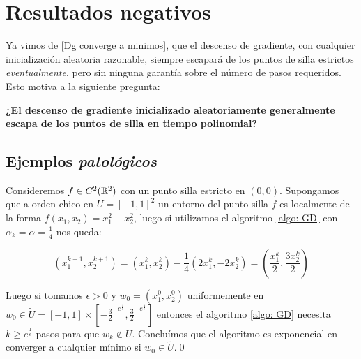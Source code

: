 \chapter{Resultados negativos}\label{ch:resultadosNegativos}

Ya vimos de \ref{Dg converge a minimos}, que el descenso de gradiente, con cualquier inicialización aleatoria razonable, siempre escapará de los puntos de silla estrictos \textit{eventualmente}, pero sin ninguna garantía sobre el número de pasos requeridos. Esto motiva a la siguiente
pregunta:

\textbf{¿El descenso de gradiente inicializado aleatoriamente generalmente escapa de los puntos de silla en tiempo polinomial?}

\section{Ejemplos \textit{patol\'ogicos}}

\begin{example}
	Consideremos $f \in C^2({\mathbb{R}}^2)$ con un punto silla estricto en $(0,0)$. Supongamos que a orden chico en $U = [-1,1]^2$ un entorno del punto silla $f$ es localmente de la forma $f(x_1, x_2) = x_1^2 - x_2^2$, luego si utilizamos el algoritmo \ref{algo: GD} con $\alpha_k = \alpha = \frac{1}{4}$ nos queda:
	
	\begin{equation*}
		\left(x_1^{k+1}, x^{k+1}_2\right) = \left(x^k_1, x^k_2\right)- \frac{1}{4} \left(2x^k_1, -2x^k_2\right) = \left(\frac{x^k_1}{2}, \frac{3 x^k_2}{2}\right)
	\end{equation*}
	
	Luego si tomamos $\epsilon >0$ y $w_0 = (x_1^0, x_2^0)$ uniformemente en $w_0\in \widetilde{U} = [-1,1] \times \left[- \frac{3}{2}^{-e^{\frac{1}{\epsilon}}}, \frac{3}{2}^{-e^{\frac{1}{\epsilon}}}\right]$ entonces el algoritmo \ref{algo: GD} necesita $k \geq e^{\frac{1}{\epsilon}}$ pasos para que $w_k \not \in U$. Conclu\'imos que el algoritmo es exponencial en converger a cualquier m\'inimo si $w_0 \in \widetilde{U}$.\qed 
	
\end{example}

